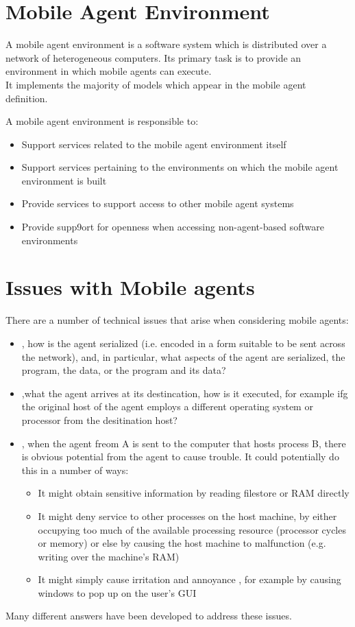 \section{Mobile Agent Environment}
A mobile agent environment is a software system which is distributed over a network of heterogeneous computers. Its primary task is to provide an environment in which mobile agents can execute.\\
It implements the majority of models which appear in the mobile agent definition.

A mobile agent environment is responsible to:
\begin{itemize}
\item Support services related to the mobile agent environment itself
\item Support services pertaining to the environments on which the mobile agent environment is built
\item Provide services to support access to other mobile agent systems
\item Provide supp9ort for openness when accessing non-agent-based software environments
\end{itemize}

\section{Issues with Mobile agents}
There are a number of technical issues that arise when considering mobile agents:
\begin{itemize}
\item {}, how is the agent serialized (i.e. encoded in a form suitable to be sent across the network), and, in particular, what aspects of the agent are serialized, the program, the data, or the program and its data?
\item {},what the agent arrives at its destincation, how is it executed, for example ifg the original host of the agent employs a different operating system or processor from the desitination host?
\item {}, when the agent freom A is sent to the computer that hosts process B, there is obvious potential from the agent to cause trouble. It could potentially do this in a number of ways:
\begin{itemize}
\item It might obtain sensitive information by reading filestore or RAM directly
\item It might deny service to other processes on the host machine, by either occupying too much of the available processing resource (processor cycles or memory) or else by causing the host machine to malfunction (e.g. writing over the machine's RAM)
\item It might simply cause irritation and annoyance , for example by causing windows to pop up on the user's GUI
\end{itemize}
\end{itemize}
Many different answers have been developed to address these issues.



